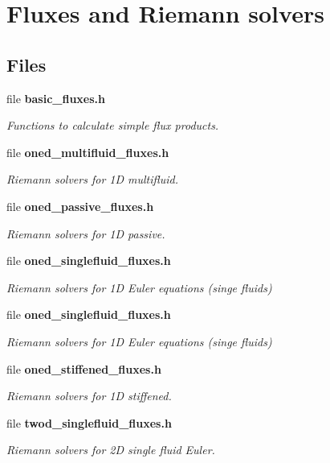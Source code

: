 \section{Fluxes and Riemann solvers}
\label{group__fluxes}
\subsection*{Files}
\begin{DoxyCompactItemize}
\item 
file {\bf basic\-\_\-fluxes.\-h}
\begin{DoxyCompactList}\small\item\em Functions to calculate simple flux products. \end{DoxyCompactList}\item 
file {\bf oned\-\_\-multifluid\-\_\-fluxes.\-h}
\begin{DoxyCompactList}\small\item\em Riemann solvers for 1\-D multifluid. \end{DoxyCompactList}\item 
file {\bf oned\-\_\-passive\-\_\-fluxes.\-h}
\begin{DoxyCompactList}\small\item\em Riemann solvers for 1\-D passive. \end{DoxyCompactList}\item 
file {\bf oned\-\_\-singlefluid\-\_\-fluxes.\-h}
\begin{DoxyCompactList}\small\item\em Riemann solvers for 1\-D Euler equations (singe fluids) \end{DoxyCompactList}\item 
file {\bf oned\-\_\-singlefluid\-\_\-fluxes.\-h}
\begin{DoxyCompactList}\small\item\em Riemann solvers for 1\-D Euler equations (singe fluids) \end{DoxyCompactList}\item 
file {\bf oned\-\_\-stiffened\-\_\-fluxes.\-h}
\begin{DoxyCompactList}\small\item\em Riemann solvers for 1\-D stiffened. \end{DoxyCompactList}\item 
file {\bf twod\-\_\-singlefluid\-\_\-fluxes.\-h}
\begin{DoxyCompactList}\small\item\em Riemann solvers for 2\-D single fluid Euler. \end{DoxyCompactList}\item 

\end{DoxyCompactItemize}

